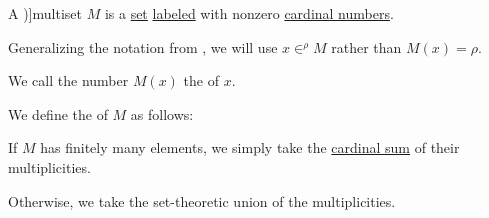 \begin{definition}\label{def:multiset}
  A \term[ru=мультимножество (\incite[28]{Новиков2013ДискретнаяМатематика})]{multiset} \( M \) is a \hyperref[def:set]{set} \hyperref[def:labeled_set]{labeled} with nonzero \hyperref[def:cardinal]{cardinal numbers}.

  Generalizing the notation from , we will use \( x \in^\rho M \) rather than \( M(x) = \rho \).

  \begin{thmenum}
     We call the number \( M(x) \) the  of \( x \).

    \mimprovised We define the  of \( M \) as follows:
    \begin{thmenum}
       If \( M \) has finitely many elements, we simply take the \hyperref[def:cardinal_arithmetic/addition]{cardinal sum} of their multiplicities.

       Otherwise, we take the set-theoretic union of the multiplicities.
    \end{thmenum}
  \end{thmenum}
\end{definition}

